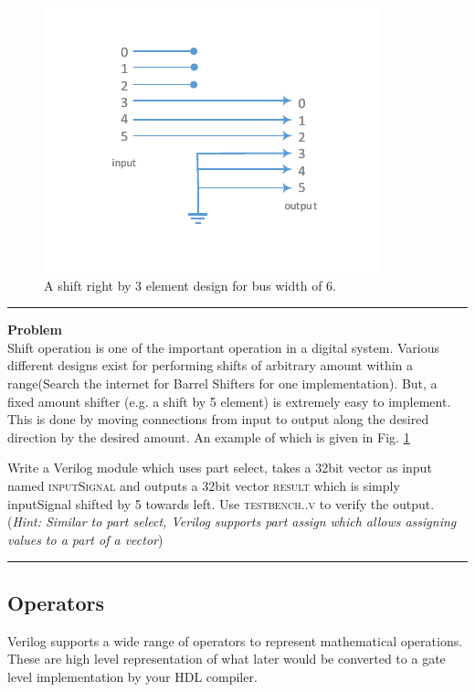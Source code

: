 \documentclass[a4paper,10pt]{article}
\newcommand{\ano}{\text{1}}
\theoremstyle{mytheor}
\newcounter{problemNumber}
\newcommand {
  \insertProblem}[1]{
  \vspace{0.5cm}
  \hrule
  \vspace{0.3cm}

  {\color{greatblue}\textbf{\large{Problem \theproblemNumber}}}
  \vspace{2pt}\\#1

  \addtocounter{problemNumber}{1}
  \vspace{0.2cm}
  \hrule  
  \vspace{0.5cm}
}
\begin{document}
\begin{figure}[!h] \centering  
  \includegraphics[width=0.45\linewidth]{./resources/shiftUsingWires_representation.pdf}
  \caption{A shift right by 3 element design for bus width of 6.} 
  \label{Fig:shiftUsingWires-representation}
\end{figure}
\insertProblem{ Shift operation is one of the important operation in a digital system. Various different designs exist for performing shifts of arbitrary amount within a range(Search the internet for Barrel Shifters for one implementation). But, a fixed amount shifter (e.g. a shift by 5 element) is extremely easy to implement. This is done by moving connections from input to output along the desired direction by the desired amount. An example of which is given in Fig. \ref{Fig:shiftUsingWires-representation} 

  Write a Verilog module which uses part select, takes a 32bit vector as input named \textsc{inputSignal} and outputs a 32bit vector \textsc{result} which is simply inputSignal shifted by 5 towards left. Use \textsc{testbench{\ano}.{\theproblemNumber}.v} to verify the output. (\textit{Hint: Similar to part select, Verilog supports part assign which allows assigning values to a part of a vector})}
%

\subsection*{Operators}
Verilog supports a wide range of operators to represent mathematical operations. These are high level representation of what later would be converted to a gate level implementation by your HDL compiler.
\end{document}
